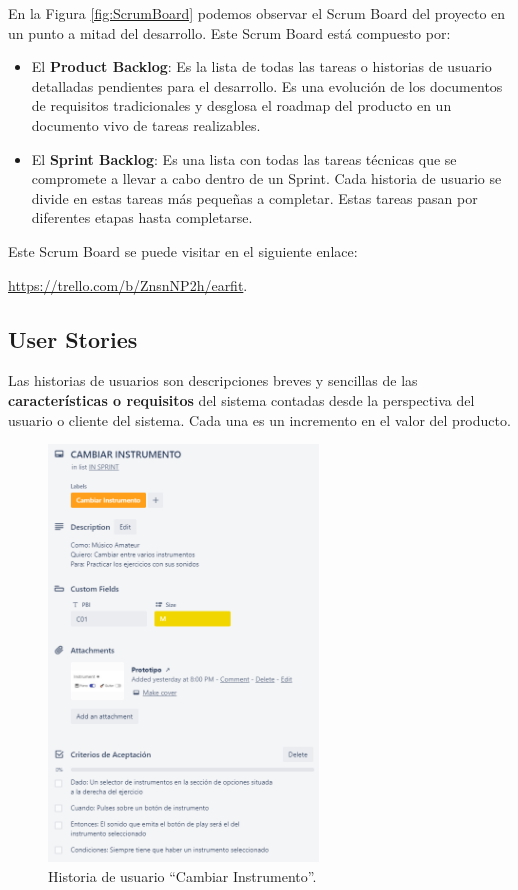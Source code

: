 \documentclass[12pt,twoside,titlepage]{report}
\begin{document}
En la Figura \ref{fig:ScrumBoard} podemos observar el Scrum Board del proyecto en un punto a mitad del desarrollo. Este Scrum Board está compuesto por:
\begin{itemize}
    \item El \textbf{Product Backlog}: Es la lista de todas las tareas o historias de usuario detalladas pendientes para el desarrollo. Es una evolución de los documentos de requisitos tradicionales y desglosa el roadmap del producto en un documento vivo de tareas realizables.
    \item El \textbf{Sprint Backlog}: Es una lista con todas las tareas técnicas que se compromete a llevar a cabo dentro de un Sprint. Cada historia de usuario se divide en estas tareas más pequeñas a completar. Estas tareas pasan por diferentes etapas hasta completarse.
\end{itemize}

Este Scrum Board se puede visitar en el siguiente enlace: 

\url{https://trello.com/b/ZnsnNP2h/earfit}.

\subsection{User Stories}

Las historias de usuarios son descripciones breves y sencillas de las \textbf{características o requisitos} del sistema contadas desde la perspectiva del usuario o cliente del sistema. Cada una es un incremento en el valor del producto.
\cite{userstories1}
\cite{userstories2}

\begin{figure}[H]
    \centering
    \includegraphics[width=0.64\textwidth]{Scrum/UserStory}
    \caption{Historia de usuario ``Cambiar Instrumento''.}
    \label{fig:UserStory}
\end{figure}
\end{document}
